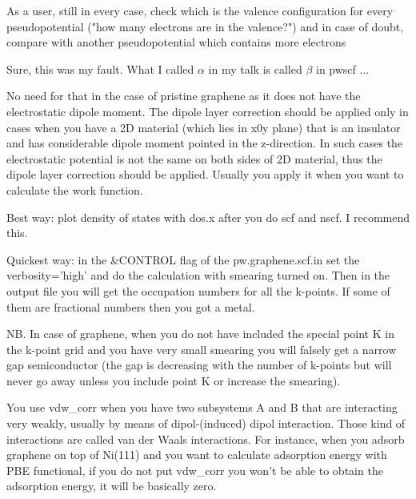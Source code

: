   As a user, still in every case, check which is the valence configuration for every pseudopotential ("how many electrons are in the valence?") and in case of doubt, compare with another pseudopotential which contains more electrons


  Sure, this was my fault. What I called $\alpha$ in my talk is called $\beta$ in pwscf ...


  No need for that in the case of pristine graphene as it does not have the electrostatic dipole moment. The dipole layer correction should be applied only in cases when you have a 2D material (which lies in x0y plane) that is an insulator and has considerable dipole moment pointed in the z-direction. In such cases the electrostatic potential is not the same on both sides of 2D material, thus the dipole layer correction should be applied. Usually you apply it when you want to calculate the work function.


  Best way: plot density of states with dos.x after you do scf and nscf. I recommend this.

  Quickest way: in the \&CONTROL flag of the pw.graphene.scf.in set the verbosity='high' and do the calculation with smearing turned on. Then in the output file you will get the occupation numbers for all the k-points. If some of them are fractional numbers then you got a metal.

  NB. In case of graphene, when you do not have included the special point K in the k-point grid and you have very small smearing you will falsely get a narrow gap semiconductor (the gap is decreasing with the number of k-points but will never go away unless you include point K or increase the smearing).


  You use vdw\_corr when you have two subsystems A and B that are interacting very weakly, usually by means of dipol-(induced) dipol interaction. Those kind of interactions are called van der Waals interactions. For instance, when you adsorb graphene on top of Ni(111) and you want to calculate adsorption energy with PBE functional, if you do not put vdw\_corr you won't be able to obtain the adsorption energy, it will be basically zero.

